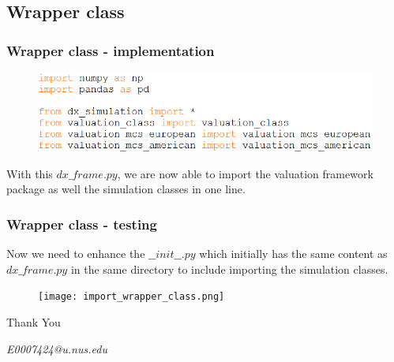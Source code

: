 \documentclass{beamer}
\begin{document}
\subsection{Wrapper class}

\begin{frame}
\frametitle{Wrapper class - implementation}
\begin{figure}[H]
	\includegraphics[scale=0.48]{wrapper_class.png}
\end{figure}
With this $dx\_frame.py$, we are now able to import the valuation framework package as well the simulation classes in one line.
\end{frame}

\begin{frame}
\frametitle{Wrapper class - testing}
Now we need to enhance the $\_\_init\_\_.py$ which initially has the same content as $dx\_frame.py$ in the same directory to include importing the simulation classes.
\begin{figure}[H]
	\texttt{[image: import\_wrapper\_class.png]}
\end{figure}
\end{frame}

\begin{frame}
\Huge{\centerline{Thank You}}
\begin{center}
\begin{normalsize}
\emph{E0007424@u.nus.edu}
\end{normalsize}
\end{center}
\end{frame}

\end{document}

